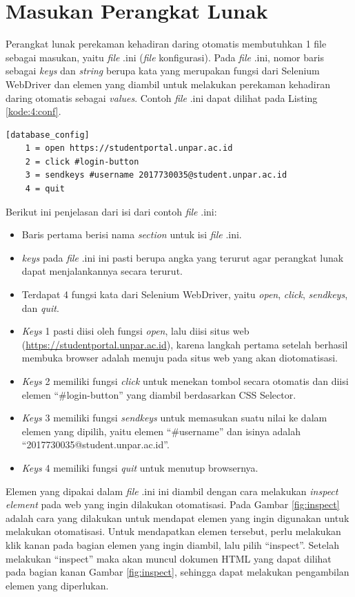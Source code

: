 \section{Masukan Perangkat Lunak}
\label{sec:inputConfig} 
Perangkat lunak perekaman kehadiran daring otomatis membutuhkan 1 file sebagai masukan, yaitu \textit{file} .ini (\textit{file} konfigurasi). Pada \textit{file} .ini, nomor baris sebagai \textit{keys} dan \textit{string} berupa kata yang merupakan fungsi dari Selenium WebDriver dan elemen yang diambil untuk melakukan perekaman kehadiran daring otomatis sebagai \textit{values}. Contoh \textit{file} .ini dapat dilihat pada Listing \ref{kode:4:conf}.
\begin{lstlisting}[caption=Contoh \textit{file} .ini untuk Masukan Perangkat Lunak Perekaman Kehadiran Daring Otomatis, label=kode:4:conf]
	[database_config]
	1 = open https://studentportal.unpar.ac.id
	2 = click #login-button
	3 = sendkeys #username 2017730035@student.unpar.ac.id 
	4 = quit
\end{lstlisting}
Berikut ini penjelasan dari isi dari contoh \textit{file} .ini:
\begin{itemize}
	\item Baris pertama berisi nama \textit{section} untuk isi \textit{file} .ini.
	\item \textit{keys} pada \textit{file} .ini ini pasti berupa angka yang terurut agar perangkat lunak dapat menjalankannya secara terurut.
	\item Terdapat 4 fungsi kata dari Selenium WebDriver, yaitu \textit{open}, \textit{click}, \textit{sendkeys}, dan \textit{quit}.
	\item \textit{Keys} 1 pasti diisi oleh fungsi \textit{open}, lalu diisi situs web (\url{https://studentportal.unpar.ac.id}), karena langkah pertama setelah berhasil membuka browser adalah menuju pada situs web yang akan diotomatisasi.
	\item \textit{Keys} 2 memiliki fungsi \textit{click} untuk menekan tombol secara otomatis dan diisi elemen ``\#login-button'' yang diambil berdasarkan CSS Selector.
	\item \textit{Keys} 3 memiliki fungsi \textit{sendkeys} untuk memasukan suatu nilai ke dalam elemen yang dipilih, yaitu elemen ``\#username'' dan isinya adalah ``2017730035@student.unpar.ac.id''.
	\item \textit{Keys} 4 memiliki fungsi \textit{quit} untuk menutup browsernya.
\end{itemize}
Elemen yang dipakai dalam \textit{file} .ini ini diambil dengan cara melakukan \textit{inspect element} pada web yang ingin dilakukan otomatisasi. Pada Gambar \ref{fig:inspect} adalah cara yang dilakukan untuk mendapat elemen yang ingin digunakan untuk melakukan otomatisasi. Untuk mendapatkan elemen tersebut, perlu melakukan klik kanan pada bagian elemen yang ingin diambil, lalu pilih ``inspect''. Setelah melakukan ``inspect'' maka akan muncul dokumen HTML yang dapat dilihat pada bagian kanan Gambar \ref{fig:inspect}, sehingga dapat melakukan pengambilan elemen yang diperlukan.
